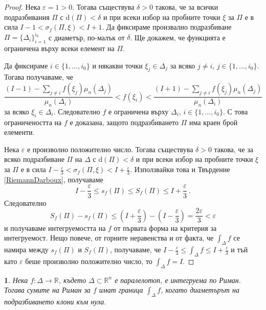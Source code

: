\documentclass[11pt]{article}
\numberwithin{equation}{section}
\numberwithin{figure}{section}
\numberwithin{table}{section}
\theoremstyle{plain}
\newtheorem{thm}{\protect\theoremname}[section]
\theoremstyle{definition}
\theoremstyle{remark}
\theoremstyle{definition}
\theoremstyle{remark}
\theoremstyle{plain}
\theoremstyle{definition}
\theoremstyle{definition}
\theoremstyle{plain}
\theoremstyle{plain}
\theoremstyle{plain}
\theoremstyle{definition}
\theoremstyle{plain}
\providecommand{\theoremname}{Теорема}
\newcommand*{\R}{\mathbb{R}}
\begin{document}
\begin{proof}
Нека $\varepsilon=1>0$. Тогава съществува $\delta>0$ такова, че за всички подразбивания $\Pi$ с $\textrm{d}(\Pi)<\delta$ и при всеки избор на пробните точки $\xi$ за $\Pi$ е в сила $I-1 < \sigma_f(\Pi, \xi)<I+1$. Да фиксираме произвално подразбиване $\Pi = \{\Delta_i \}_{i=1}^{i_0}$ с диаметър, по-малък от $\delta$. Ще докажем, че функцията е ограничена върху всеки елемент на $\Pi$. 

Да фиксираме $i\in \{ 1,\dots ,i_0\}$ и някакви точки $\xi_j\in \Delta_j$ за всяко $j\neq i$, $j\in \{ 1,\dots ,i_0\}$. Тогава получаваме, че 
$$\frac{(I-1)-\sum_{j\neq i} f(\xi_j) \mu_n(\Delta_j)}{\mu_n(\Delta_i)} < f(\xi_i) < \frac{(I+1) - \sum_{j\neq i} f(\xi_j)\mu_n(\Delta_j)}{\mu_n(\Delta_i)}$$
за всяко $\xi_i\in \Delta_i$. Следователно $f$ е ограничена върху $\Delta_i$, $i\in \{ 1,\dots ,i_0\}$. С това ограничеността на $f$ е доказана, защото подразбиването $\Pi$ има краен брой елементи.

Нека $\varepsilon$ е произволно положително число. Тогава съществува $\delta >0$ такова, че за всяко подразбиване $\Pi$ на $\Delta$ с $\textrm{d}(\Pi)<\delta$ и при всеки избор на пробните точки $\xi$ за $\Pi$ е в сила $I-\frac{\varepsilon}{3} < \sigma_f(\Pi, \xi)<I+\frac{\varepsilon}{3}$. Използвайки това и Твърдение \ref{RiemannDarboux}, получаваме
$$I-\frac{\varepsilon}{3} \le s_f(\Pi) \le S_f(\Pi) \le I+\frac{\varepsilon}{3} \ .$$
Следователно 
$$S_f(\Pi)-s_f(\Pi)\le \left( I+\frac{\varepsilon}{3}\right)-\left( I-\frac{\varepsilon}{3}\right)=\frac{2\varepsilon}{3}< \varepsilon$$
и получаваме интегруемостта на $f$ от първата форма на критерия за интегруемост. Нещо повече, от горните неравенства и от факта, че $\int_\Delta f$ се намира между $s_f(\Pi)$ и $S_f(\Pi)$, получаваме, че $I-\frac{\varepsilon}{3} \le\int_\Delta f\le I+\frac{\varepsilon}{3}$ и тъй като $\varepsilon$ беше произволно положително число, то $\int_\Delta f =I$.
\end{proof}

\bigskip

\begin{thm}\label{hard_equivalence}
Нека $f:\Delta\rightarrow\R$, където $\Delta \subset \R^n$ е паралелотоп, е интегруема по Риман. Тогава сумите на Риман за $f$ имат граница $\int_\Delta f$, когато диаметърът на подразбиването клони към нула. 
\end{thm}
\end{document}
